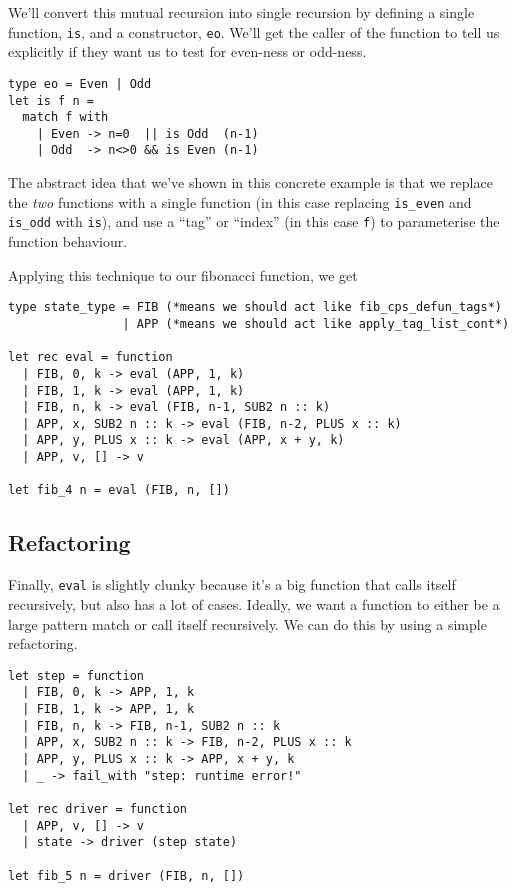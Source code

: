 We'll convert this mutual recursion into single recursion by defining a single function, \texttt{is}, and a constructor, \texttt{eo}. We'll get the caller of the function to tell us explicitly if they want us to test for even-ness or odd-ness.

\begin{code}
\label{code:mutual-recursion}
\begin{verbatim}
type eo = Even | Odd
let is f n = 
  match f with
    | Even -> n=0  || is Odd  (n-1)
    | Odd  -> n<>0 && is Even (n-1)
\end{verbatim}
\end{code}

The abstract idea that we've shown in this concrete example is that we replace the \emph{two} functions with a single function (in this case replacing \texttt{is\_even} and \texttt{is\_odd} with \texttt{is}), and use a ``tag'' or ``index'' (in this case \texttt{f}) to parameterise the function behaviour.

Applying this technique to our fibonacci function, we get
\begin{code}
\label{code:defun-list-fib}
\begin{verbatim}
type state_type = FIB (*means we should act like fib_cps_defun_tags*)
                | APP (*means we should act like apply_tag_list_cont*)

let rec eval = function
  | FIB, 0, k -> eval (APP, 1, k)
  | FIB, 1, k -> eval (APP, 1, k)
  | FIB, n, k -> eval (FIB, n-1, SUB2 n :: k)
  | APP, x, SUB2 n :: k -> eval (FIB, n-2, PLUS x :: k)
  | APP, y, PLUS x :: k -> eval (APP, x + y, k)
  | APP, v, [] -> v

let fib_4 n = eval (FIB, n, [])
\end{verbatim}
\end{code}

\subsection{Refactoring}
Finally, \texttt{eval} is slightly clunky because it's a big function that calls itself recursively, but also has a lot of cases. Ideally, we want a function to either be a large pattern match or call itself recursively. We can do this by using a simple refactoring. 

\begin{code}
\label{code:defun-list-fib}
\begin{verbatim}
let step = function
  | FIB, 0, k -> APP, 1, k
  | FIB, 1, k -> APP, 1, k
  | FIB, n, k -> FIB, n-1, SUB2 n :: k
  | APP, x, SUB2 n :: k -> FIB, n-2, PLUS x :: k
  | APP, y, PLUS x :: k -> APP, x + y, k
  | _ -> fail_with "step: runtime error!"

let rec driver = function
  | APP, v, [] -> v
  | state -> driver (step state)

let fib_5 n = driver (FIB, n, [])
\end{verbatim}
\end{code}

